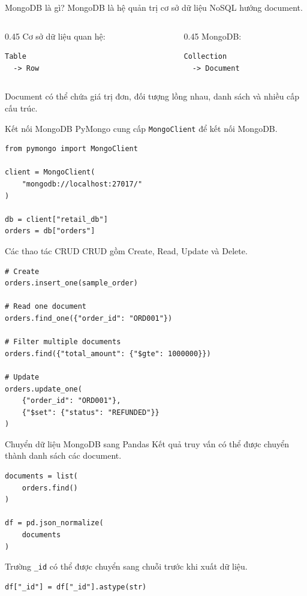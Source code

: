 \documentclass[aspectratio=169,11pt]{beamer}
\newcommand{\code}[1]{\texttt{#1}}
\newcommand{\smallgap}{\vspace{0.4em}}
\begin{document}
\begin{frame}[fragile]{MongoDB là gì?}
MongoDB là hệ quản trị cơ sở dữ liệu NoSQL hướng document.

\begin{columns}[T]
\begin{column}{0.45\textwidth}
Cơ sở dữ liệu quan hệ:
\begin{lstlisting}[style=textstyle]
Table
  -> Row
\end{lstlisting}
\end{column}
\begin{column}{0.45\textwidth}
MongoDB:
\begin{lstlisting}[style=textstyle]
Collection
  -> Document
\end{lstlisting}
\end{column}
\end{columns}

\smallgap
Document có thể chứa giá trị đơn, đối tượng lồng nhau, danh sách và nhiều cấp cấu trúc.
\end{frame}

\begin{frame}[fragile]{Kết nối MongoDB}
PyMongo cung cấp \code{MongoClient} để kết nối MongoDB.

\begin{lstlisting}[style=pythonstyle]
from pymongo import MongoClient

client = MongoClient(
    "mongodb://localhost:27017/"
)

db = client["retail_db"]
orders = db["orders"]
\end{lstlisting}
\end{frame}

\begin{frame}[fragile]{Các thao tác CRUD}
CRUD gồm Create, Read, Update và Delete.

\begin{lstlisting}[style=pythonstyle]
# Create
orders.insert_one(sample_order)

# Read one document
orders.find_one({"order_id": "ORD001"})

# Filter multiple documents
orders.find({"total_amount": {"$gte": 1000000}})

# Update
orders.update_one(
    {"order_id": "ORD001"},
    {"$set": {"status": "REFUNDED"}}
)
\end{lstlisting}
\end{frame}

\begin{frame}[fragile]{Chuyển dữ liệu MongoDB sang Pandas}
Kết quả truy vấn có thể được chuyển thành danh sách các document.

\begin{lstlisting}[style=pythonstyle]
documents = list(
    orders.find()
)

df = pd.json_normalize(
    documents
)
\end{lstlisting}

Trường \code{\_id} có thể được chuyển sang chuỗi trước khi xuất dữ liệu.
\begin{lstlisting}[style=pythonstyle]
df["_id"] = df["_id"].astype(str)
\end{lstlisting}
\end{frame}
\end{document}
